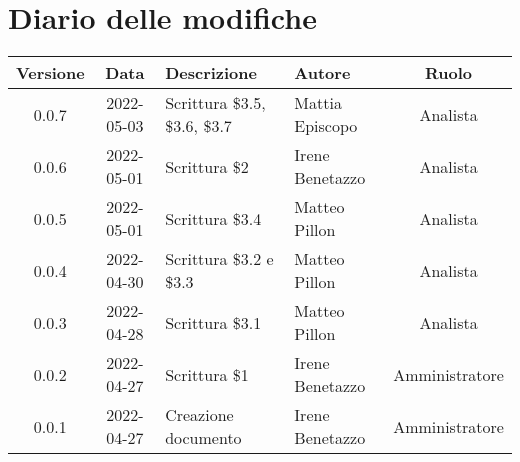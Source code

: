 \section*{Diario delle modifiche}
	\begin{center}
	\renewcommand{\arraystretch}{1.8} %
	\begin{tabular}{ |c|c|m{12em}|m{7em}|c| }
	\hline
	
	\textbf{Versione} & \textbf{Data} & \textbf{Descrizione} &  \textbf{Autore} &  \textbf{Ruolo} \\ %
	\hline
    0.0.7 & 2022-05-03 & Scrittura \$3.5, \$3.6, \$3.7 & Mattia \newline Episcopo & Analista\\
	\hline
    0.0.6 & 2022-05-01 & Scrittura \$2 & Irene Benetazzo & Analista\\
	\hline
    0.0.5 & 2022-05-01 & Scrittura \$3.4 & Matteo Pillon & Analista \\ %
	\hline
    0.0.4 & 2022-04-30 & Scrittura \$3.2 e \$3.3 & Matteo Pillon & Analista \\ %
	\hline
    0.0.3 & 2022-04-28 & Scrittura \$3.1 & Matteo Pillon & Analista \\ %
	\hline
    0.0.2 & 2022-04-27 & Scrittura \$1 & Irene Benetazzo & Amministratore\\ %
	\hline
    0.0.1 & 2022-04-27 & Creazione documento & Irene Benetazzo & Amministratore\\
	\hline
	\end{tabular}
	\end{center}
	\newpage
